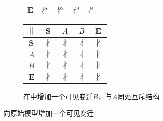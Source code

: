 \begin{figure}[htbp]
\begin{subfigure}{1\textwidth}
\begin{minipage}[b]{0.3\textwidth}
\begin{tabular}{|c|c|c|c|c|}
        $\bm{E}$ & $\overset{\text{\tiny{IA}}}{\leftarrow}$ & $\overset{\text{\tiny{DS}}}{\leftarrow}$ & $\overset{\text{\tiny{DS}}}{\leftarrow}$ & $\overset{\text{\tiny{N}}}{\leftarrow}$\\ \hline
      \end{tabular}
    \end{minipage}
    \begin{minipage}[b]{0.3\textwidth}
      \vspace{1em}
      \centering
      \begin{tabular}{|c|c|c|c|c|} \hline
        $\parallel$ & $\bm{S}$ & $A$ & $B$ & $\bm{E}$\\ \hline
        $\bm{S}$ & $\nparallel$ & $\nparallel$ & $\nparallel$ & $\nparallel$\\ \hline
        $A$ & $\nparallel$ & $\nparallel$ & $\nparallel$ & $\nparallel$\\ \hline
        $B$ & $\nparallel$ & $\nparallel$ & $\nparallel$ & $\nparallel$\\ \hline
        $\bm{E}$ & $\nparallel$ & $\nparallel$ & $\nparallel$ & $\nparallel$\\ \hline
      \end{tabular}
    \end{minipage}
    \caption{在中增加一个可见变迁$B$，与$A$同处互斥结构}
    \label{fig:uniqueness_2_d}
  \end{subfigure}
  \vspace{6pt}
  \caption{向原始模型增加一个可见变迁}
\end{figure}

